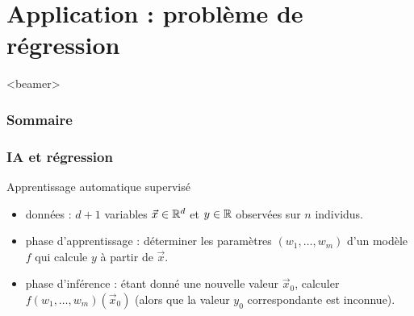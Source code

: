 \documentclass{beamer}
\newcommand{\R}{{\ensuremath\mathbb{R}}}
\begin{document}




  
  

\section{Application : problème de régression}

\begin{frame}<beamer>
  \frametitle{Sommaire}
  \tableofcontents[currentsection]
\end{frame}

\begin{frame}
  \frametitle{IA et régression}

  \begin{block}{Apprentissage automatique supervisé}

    \begin{itemize}
      \item données : $d+1$ variables $\vec{x} \in \R^d$ et $y \in \R$ observées sur $n$ individus. 
      \item phase d'apprentissage : déterminer les paramètres $(w_1, \dots, w_m)$ d'un modèle $f$
        qui calcule $y$ à partir de $\vec{x}$.
      \item phase d'inférence : étant donné une nouvelle valeur $\vec{x}_0$,
        calculer $f(w_1, \dots, w_m)(\vec{x}_0)$
        (alors que la valeur $y_0$ correspondante est inconnue). 
    \end{itemize}
  \end{block}

\end{frame}
\end{document}
